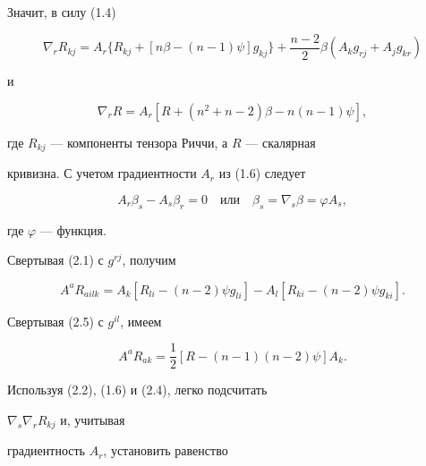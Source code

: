 Значит, в силу (1.4) 


\begin{equation} 


\nabla_r R_{kj}=A_r\{R_{kj}+[n\beta-(n-1)\psi]g_{kj}\}+ 


\frac{n-2}{2}\beta(A_k g_{rj}+A_j g_{kr}) 


\end{equation} 


и 


\begin{equation} 


\nabla_r R=A_r[R+(n^2+n-2)\beta-n(n-1)\psi], 


\end{equation} 


где $R_{kj}$ --- компоненты тензора Риччи, а $R$ --- скалярная 


кривизна. С учетом градиентности $A_r$ из (1.6) следует 


\begin{equation} 


A_r\beta_s-A_s\beta_r=0\quad 


\text{или} 


\quad \beta_s=\nabla_s\beta=\varphi A_s, 


\end{equation} 


где $\varphi$ --- функция. 


 


Свертывая (2.1) с $g^{rj}$, получим 


\begin{equation} 


A^a R_{ailk}=A_k[R_{li}-(n-2)\psi g_{li}]- 


A_l[R_{ki}-(n-2)\psi g_{ki}]. 


\end{equation} 


Свертывая (2.5) с $g^{il}$, имеем 


\begin{equation} 


A^a R_{ak}=\frac{1}{2}[R-(n-1)(n-2)\psi]A_k. 


\end{equation} 


Используя (2.2), (1.6) и (2.4), легко подсчитать 


$\nabla_s\nabla_r R_{kj}$ и, учитывая 


градиентность $A_r$, установить равенство 



